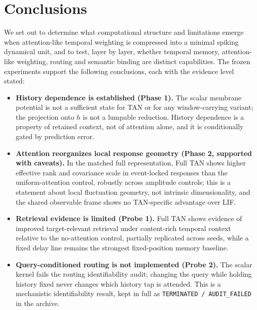 \section{Conclusions}\label{sec:conclusion}

We set out to determine what computational structure and limitations
emerge when attention-like temporal weighting is compressed into a
minimal spiking dynamical unit, and to test, layer by layer, whether
temporal memory, attention-like weighting, routing and semantic binding
are distinct capabilities.  The frozen experiments support the following
conclusions, each with the evidence level stated:

\begin{itemize}
  \item \textbf{History dependence is established (Phase 1).}  The
    scalar membrane potential is not a sufficient state for TAN or for
    any window-carrying variant; the projection onto $h$ is not a
    lumpable reduction.  History dependence is a property of retained
    context, not of attention alone, and it is conditionally gated by
    prediction error.
  \item \textbf{Attention reorganizes local response geometry (Phase 2,
    supported with caveats).}  In the matched full representation, Full
    TAN shows higher effective rank and covariance scale in
    event-locked responses than the uniform-attention control, robustly
    across amplitude controls; this is a statement about local
    fluctuation geometry, not intrinsic dimensionality, and the shared
    observable frame shows no TAN-specific advantage over LIF.
  \item \textbf{Retrieval evidence is limited (Probe 1).}  Full TAN
    shows evidence of improved target-relevant retrieval under
    content-rich temporal context relative to the no-attention control,
    partially replicated across seeds, while a fixed delay line remains
    the strongest fixed-position memory baseline.
  \item \textbf{Query-conditioned routing is not implemented (Probe 2).}
    The scalar kernel fails the routing identifiability audit; changing
    the query while holding history fixed never changes which history
    tap is attended.  This is a mechanistic identifiability result, kept
    in full as \texttt{TERMINATED / AUDIT\_FAILED} in the archive.
\end{itemize}

